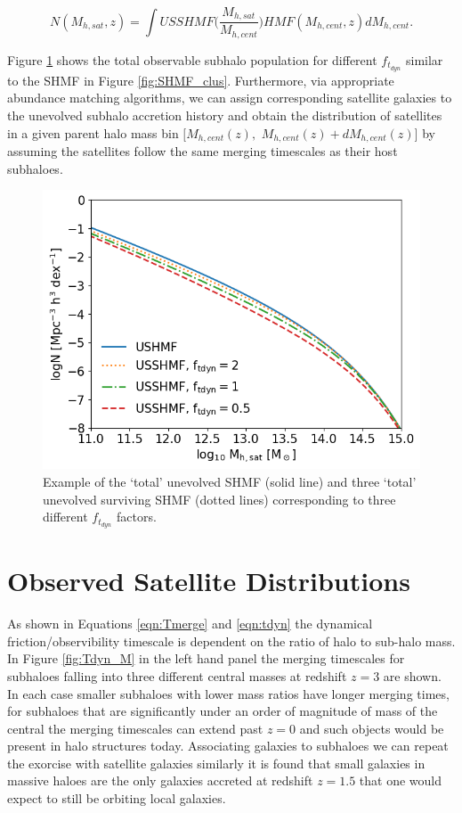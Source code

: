 \begin{equation}
\label{eqn:GSHMF}
N(M_{h, sat}, z) =
\int USSHMF\Bigg(\frac{M_{h, sat}}{M_{h, cent}}\Bigg)HMF(M_{h, cent}, z)dM_{h, cent}.
\end{equation}

Figure \ref{fig:SHMF} shows the total observable subhalo population for different  $f_{t_{dyn}}$ similar to the SHMF in Figure \ref{fig:SHMF_clus}. Furthermore, via appropriate abundance matching algorithms, we can assign corresponding satellite galaxies to the unevolved subhalo accretion history and obtain the distribution of satellites in a given parent halo mass bin $[M_{h,cent}(z),$ $M_{h,cent}(z) + dM_{h,cent}(z)]$ by assuming the satellites follow the same merging timescales as their host subhaloes.

\begin{figure}
	\centering
	\includegraphics[width = \linewidth]{Figures/Chapter3/SHMF.png}
	\caption{Example of the `total' unevolved SHMF (solid line) and three `total' unevolved surviving SHMF (dotted lines) corresponding to three different $f_{t_{dyn}}$ factors.}
	\label{fig:SHMF}
\end{figure}

\section{Observed Satellite Distributions}

As shown in Equations \ref{eqn:Tmerge} and \ref{eqn:tdyn} the dynamical friction/observibility timescale is dependent on the ratio of halo to sub-halo mass. In Figure \ref{fig:Tdyn_M} in the left hand panel the merging timescales for subhaloes falling into three different central masses at redshift $z=3$ are shown. In each case smaller subhaloes with lower mass ratios have longer merging times, for subhaloes that are significantly under an order of magnitude of mass of the central the merging timescales can extend past $z=0$ and such objects would be present in halo structures today. Associating galaxies to subhaloes we can repeat the exorcise with satellite galaxies similarly it is found that small galaxies in massive haloes are the only galaxies accreted at redshift $z = 1.5$ that one would expect to still be orbiting local galaxies.

